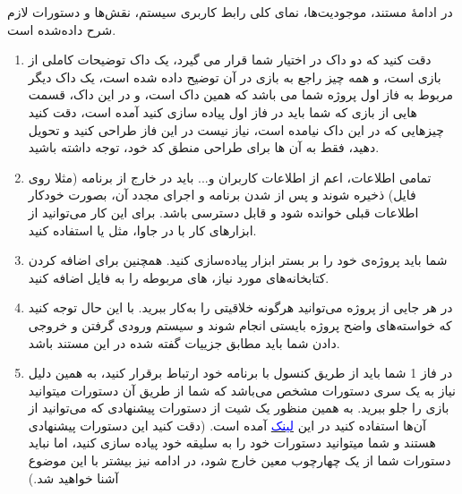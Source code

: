 \documentclass[]{article}
\begin{document}
در ادامهٔ مستند، موجودیت‌ها، نمای کلی رابط کاربری سیستم، نقش‌ها و دستورات لازم شرح داده‌شده است.

\begin{enumerate}[label={نکته \arabic*:}]
	\item
دقت کنید که دو داک در اختیار شما قرار می گیرد، یک داک توضیحات کاملی از بازی است، و همه چیز راجع به بازی در آن توضیح داده شده است، یک داک دیگر مربوط به فاز اول پروژه شما می باشد که همین داک است، و در این داک، قسمت هایی از بازی که شما باید در فاز اول پیاده سازی کنید آمده است، دقت کنید چیزهایی که در این داک نیامده است، نیاز نیست در این فاز طراحی کنید و تحویل دهید، فقط به آن ها برای طراحی منطق کد خود، توجه داشته باشید.
	
\item
 تمامی اطلاعات، اعم از اطلاعات کاربران و... باید در خارج از برنامه (مثلا روی فایل) ذخیره شوند و پس از  شدن برنامه و اجرای مجدد آن، بصورت خودکار اطلاعات قبلی خوانده شود و قابل دسترسی باشد. برای این کار می‌توانید از ابزارهای کار با  در جاوا، مثل
  \href{https://www.tutorialspoint.com/gson/gson_quick_guide.htm}{\textcolor{blue}{}}
یا
  \href{https://github.com/amogilev/yagson}{\textcolor{blue}{}}
   استفاده‌ کنید.

\item
شما باید پروژه‌ی خود را بر بستر ابزار  پیاده‌سازی کنید. همچنین برای اضافه کردن کتابخانه‌های مورد نیاز،  های مربوطه را به فایل  اضافه کنید.




   

\item
در هر جایی از پروژه می‌توانید هرگونه خلاقیتی را به‌کار ببرید. با این حال توجه کنید که خواسته‌های واضح پروژه بایستی انجام شوند و سیستم ورودی گرفتن و خروجی دادن شما باید مطابق جزییات گفته شده در این مستند باشد.


\item در فاز 1 شما باید از طریق کنسول با برنامه خود ارتباط برقرار کنید، به همین دلیل نیاز به یک سری دستورات مشخص می‌باشد که شما از طریق آن دستورات میتوانید بازی را جلو ببرید. به همین منظور یک شیت از دستورات پیشنهادی که می‌توانید از آن‌ها استفاده کنید در این 
 \href{https://docs.google.com/spreadsheets/d/1RQ39m9OvT02mWJlHSsSx2l5XLD5jJ1ifXRnBlijUy34/edit?usp=drivesdk}{\textcolor{blue}{لینک}}
آمده است. (دقت کنید این دستورات پیشنهادی هستند و شما میتوانید دستورات خود را به سلیقه خود پیاده سازی کنید، اما نباید دستورات شما از یک چهارچوب معین خارج شود، در ادامه نیز بیشتر با این موضوع آشنا خواهید شد.)


\end{enumerate}
\end{document}
